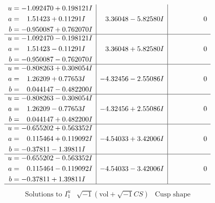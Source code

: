 \documentclass[1p]{elsarticle_modified}
\theoremstyle{definition}
\newcommand{\I}{\sqrt{-1}}
\begin{document}
$$\begin{array}{c|c|c}
\begin{aligned}
u &= -1.092470 + 0.198121 I \\
a &= \phantom{-}1.51423 + 0.11291 I \\
b &= -0.950087 + 0.762070 I\end{aligned}
 & \phantom{-}3.36048 - 5.82580 I & \phantom{-0.000000 } 0 \\ \hline\begin{aligned}
u &= -1.092470 - 0.198121 I \\
a &= \phantom{-}1.51423 - 0.11291 I \\
b &= -0.950087 - 0.762070 I\end{aligned}
 & \phantom{-}3.36048 + 5.82580 I & \phantom{-0.000000 } 0 \\ \hline\begin{aligned}
u &= -0.808263 + 0.308054 I \\
a &= \phantom{-}1.26209 + 0.77653 I \\
b &= \phantom{-}0.044147 - 0.482200 I\end{aligned}
 & -4.32456 - 2.55086 I & \phantom{-0.000000 } 0 \\ \hline\begin{aligned}
u &= -0.808263 - 0.308054 I \\
a &= \phantom{-}1.26209 - 0.77653 I \\
b &= \phantom{-}0.044147 + 0.482200 I\end{aligned}
 & -4.32456 + 2.55086 I & \phantom{-0.000000 } 0 \\ \hline\begin{aligned}
u &= -0.655202 + 0.563352 I \\
a &= \phantom{-}0.115464 + 0.119092 I \\
b &= -0.37811 - 1.39811 I\end{aligned}
 & -4.54033 + 3.42006 I & \phantom{-0.000000 } 0 \\ \hline\begin{aligned}
u &= -0.655202 - 0.563352 I \\
a &= \phantom{-}0.115464 - 0.119092 I \\
b &= -0.37811 + 1.39811 I\end{aligned}
 & -4.54033 - 3.42006 I & \phantom{-0.000000 } 0\\
 \hline 
 \end{array}$$\newpage$$\begin{array}{c|c|c}  
\text{Solutions to }I^u_{1}& \I (\text{vol} + \sqrt{-1}CS) & \text{Cusp shape}\\
 \hline 
\begin{aligned}

\end{aligned}
\end{array}$$
\end{document}
